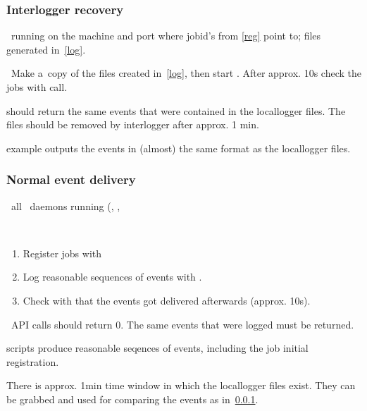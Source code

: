 \subsubsection{Interlogger recovery}
\label{recover}
\req\ running  on the machine and port where 
jobid's from \ref{reg} point to; files generated in~\ref{log}.

\how\ Make a~copy of the files created in~\ref{log}, then start
. After approx. 10s check the jobs
with  call. 

\result {} should return the same events that were
contained in the locallogger files. The files should be removed by 
interlogger after approx. 1 min.

\begin{hints}
 example outputs the events in (almost) the same
format as the locallogger files.
\end{hints}

\subsubsection{Normal event delivery}
\label{normal}
\req\ all \LB\ daemons running (, ,

\how\
\begin{enumerate}

\item Register jobs with  
\item Log reasonable sequences of events with .
\item Check with \code{edg\_wll\_JobLog}
that the events got delivered afterwards (approx. 10s).
\end{enumerate}

\result\ API calls should return 0. The same events that were logged must be returned.

\begin{hints}
 scripts produce reasonable seqences of events, including
the job initial registration.

There is approx. 1min time window in which the locallogger files exist.
They can be grabbed and used for comparing the events as in~\ref{recover}.

\end{hints}



